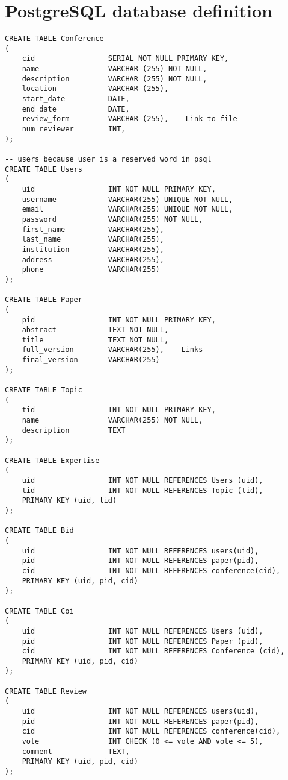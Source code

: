 \documentclass[12pt]{article}
\newcommand{\<}{\langle}
\renewcommand{\>}{\rangle}
\begin{document}
\part{PostgreSQL database definition}

\begin{verbatim}
CREATE TABLE Conference
(
    cid                 SERIAL NOT NULL PRIMARY KEY,
    name                VARCHAR (255) NOT NULL,
    description         VARCHAR (255) NOT NULL,
    location            VARCHAR (255),
    start_date          DATE,
    end_date            DATE,
    review_form         VARCHAR (255), -- Link to file
    num_reviewer        INT,  
);

-- users because user is a reserved word in psql
CREATE TABLE Users 
(
    uid                 INT NOT NULL PRIMARY KEY,
    username            VARCHAR(255) UNIQUE NOT NULL,
    email               VARCHAR(255) UNIQUE NOT NULL,
    password            VARCHAR(255) NOT NULL,
    first_name          VARCHAR(255),
    last_name           VARCHAR(255),
    institution         VARCHAR(255),
    address             VARCHAR(255),
    phone               VARCHAR(255)
);

CREATE TABLE Paper 
(
    pid                 INT NOT NULL PRIMARY KEY,
    abstract            TEXT NOT NULL,
    title               TEXT NOT NULL,
    full_version        VARCHAR(255), -- Links
    final_version       VARCHAR(255)
);

CREATE TABLE Topic 
(
    tid                 INT NOT NULL PRIMARY KEY,
    name                VARCHAR(255) NOT NULL,
    description         TEXT
);

CREATE TABLE Expertise 
(
    uid                 INT NOT NULL REFERENCES Users (uid),
    tid                 INT NOT NULL REFERENCES Topic (tid),
    PRIMARY KEY (uid, tid)
);

CREATE TABLE Bid 
(
    uid                 INT NOT NULL REFERENCES users(uid),
    pid                 INT NOT NULL REFERENCES paper(pid),
    cid                 INT NOT NULL REFERENCES conference(cid),
    PRIMARY KEY (uid, pid, cid)
);

CREATE TABLE Coi
(
    uid                 INT NOT NULL REFERENCES Users (uid),
    pid                 INT NOT NULL REFERENCES Paper (pid),
    cid                 INT NOT NULL REFERENCES Conference (cid),
    PRIMARY KEY (uid, pid, cid)
);

CREATE TABLE Review 
(
    uid                 INT NOT NULL REFERENCES users(uid),
    pid                 INT NOT NULL REFERENCES paper(pid),
    cid                 INT NOT NULL REFERENCES conference(cid),
    vote                INT CHECK (0 <= vote AND vote <= 5),
    comment             TEXT,
    PRIMARY KEY (uid, pid, cid)
);


\end{verbatim}
\end{document}
